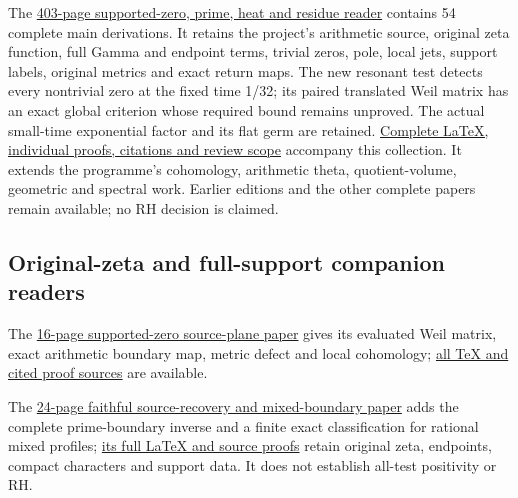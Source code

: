 \documentclass[
]{article}
\begin{document}
The
\href{https://github.com/KokunoYumeto/zeta-function-research-reader/blob/main/workbenches/splitzero-tandem/branches/tau-zero-prime-positivity/TAU_ZERO_PRIME_POSITIVITY.pdf}{403-page
supported-zero, prime, heat and residue reader} contains 54 complete
main derivations. It retains the project's arithmetic source, original
zeta function, full Gamma and endpoint terms, trivial zeros, pole, local
jets, support labels, original metrics and exact return maps. The new
resonant test detects every nontrivial zero at the fixed time 1/32; its
paired translated Weil matrix has an exact global criterion whose
required bound remains unproved. The actual small-time exponential
factor and its flat germ are retained.
\href{https://github.com/KokunoYumeto/zeta-function-research-reader/blob/main/workbenches/splitzero-tandem/branches/tau-zero-prime-positivity/PUBLICATION_COMPANION.md}{Complete
LaTeX, individual proofs, citations and review scope} accompany this
collection. It extends the programme's cohomology, arithmetic theta,
quotient-volume, geometric and spectral work. Earlier editions and the
other complete papers remain available; no RH decision is claimed.

\subsection{Original-zeta and full-support companion
readers}\label{original-zeta-and-full-support-companion-readers}

The
\href{https://github.com/KokunoYumeto/zeta-function-research-reader/blob/main/workbenches/splitzero-tandem/continuations/20260923-retained-source-readers/two-source-supported-zero/NOTE.pdf}{16-page
supported-zero source-plane paper} gives its evaluated Weil matrix,
exact arithmetic boundary map, metric defect and local cohomology;
\href{https://github.com/KokunoYumeto/zeta-function-research-reader/blob/main/workbenches/splitzero-tandem/continuations/20260923-retained-source-readers/two-source-supported-zero/PUBLICATION_READING.md}{all
TeX and cited proof sources} are available.

The
\href{https://github.com/KokunoYumeto/zeta-function-research-reader/blob/main/workbenches/splitzero-tandem/continuations/20260923-retained-source-readers/adelic-boundary-recovery/ADELIC_BOUNDARY_RECOVERY_READER.pdf}{24-page
faithful source-recovery and mixed-boundary paper} adds the complete
prime-boundary inverse and a finite exact classification for rational
mixed profiles;
\href{https://github.com/KokunoYumeto/zeta-function-research-reader/blob/main/workbenches/splitzero-tandem/continuations/20260923-retained-source-readers/adelic-boundary-recovery/ADELIC_BOUNDARY_RECOVERY_READER.tex}{its
full LaTeX and source proofs} retain original zeta, endpoints, compact
characters and support data. It does not establish all-test positivity
or RH.
\end{document}
